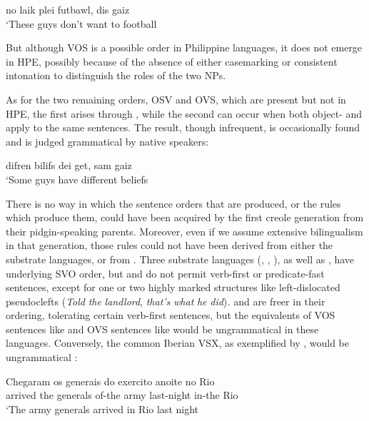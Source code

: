 

\ea\label{ex:27}
 no laik plei futbawl, dis gaiz\\
\glt  `These guys don't want to  football
\z

\noindent But although VOS is a possible order in Philippine languages, it does not emerge in HPE, possibly because of the absence of either case\-marking or consistent intonation to distinguish the roles of the two NPs.

As for the two remaining orders, OSV and OVS, which are present  but not in HPE, the first arises through , while the second can occur when both object- and  apply to the same sentences. The result, though infrequent, is occasion\-ally found and is judged grammatical by native speakers:

\ea\label{ex:28}
 difren bilifs dei get, sam gaiz \\
\glt  `Some guys have different beliefs
\z

There is no way in which the sentence orders that are produced, or the rules which produce them, could have been acquired by the first creole generation from their pidgin-speaking parents. Moreover, even if we assume extensive bilingualism in that generation, those rules could not have been derived from either the substrate languages, or from . Three substrate languages (, , ), as well as , have underlying SVO order, but  and  do not permit verb-first or predicate-fast sentences, except for one or two highly marked structures like  left-dislocated pseudo\-clefts (\textit{Told} \textit{the} \textit{landlord}, \textit{that's} \textit{what} \textit{he} \textit{did})\textit{.}  and  are freer in their ordering, tolerating certain  verb-first sen\-tences, but the equivalents of VOS sentences like  and OVS sen\-tences like  would be ungrammatical in these languages. Conversely, the common Iberian VSX, as exemplified by , would be ungrammatical :

\ea\label{ex:29}
 \gll Chegaram os generais do exercito anoite no Rio\\ 
	  arrived the generals of-the army last-night in-the Rio\\
 \glt `The army generals arrived in Rio last night
\glt 
\z

